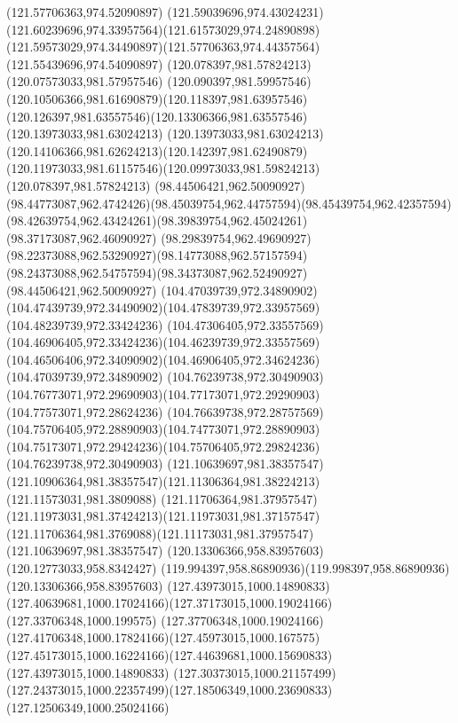 {    \lineto(121.57706363,974.52090897)
    \curveto(121.59039696,974.43024231)(121.60239696,974.33957564)(121.61573029,974.24890898)
    \curveto(121.59573029,974.34490897)(121.57706363,974.44357564)(121.55439696,974.54090897)
    \moveto(120.078397,981.57824213)
    \lineto(120.07573033,981.57957546)
    \curveto(120.090397,981.59957546)(120.10506366,981.61690879)(120.118397,981.63957546)
    \curveto(120.126397,981.63557546)(120.13306366,981.63557546)(120.13973033,981.63024213)
    \curveto(120.13973033,981.63024213)(120.14106366,981.62624213)(120.142397,981.62490879)
    \curveto(120.11973033,981.61157546)(120.09973033,981.59824213)(120.078397,981.57824213)
    \moveto(98.44506421,962.50090927)
    \curveto(98.44773087,962.4742426)(98.45039754,962.44757594)(98.45439754,962.42357594)
    \curveto(98.42639754,962.43424261)(98.39839754,962.45024261)(98.37173087,962.46090927)
    \curveto(98.29839754,962.49690927)(98.22373088,962.53290927)(98.14773088,962.57157594)
    \curveto(98.24373088,962.54757594)(98.34373087,962.52490927)(98.44506421,962.50090927)
    \moveto(104.47039739,972.34890902)
    \curveto(104.47439739,972.34490902)(104.47839739,972.33957569)(104.48239739,972.33424236)
    \curveto(104.47306405,972.33557569)(104.46906405,972.33424236)(104.46239739,972.33557569)
    \curveto(104.46506406,972.34090902)(104.46906405,972.34624236)(104.47039739,972.34890902)
    \moveto(104.76239738,972.30490903)
    \curveto(104.76773071,972.29690903)(104.77173071,972.29290903)(104.77573071,972.28624236)
    \curveto(104.76639738,972.28757569)(104.75706405,972.28890903)(104.74773071,972.28890903)
    \curveto(104.75173071,972.29424236)(104.75706405,972.29824236)(104.76239738,972.30490903)
    \moveto(121.10639697,981.38357547)
    \curveto(121.10906364,981.38357547)(121.11306364,981.38224213)(121.11573031,981.3809088)
    \curveto(121.11706364,981.37957547)(121.11973031,981.37424213)(121.11973031,981.37157547)
    \curveto(121.11706364,981.3769088)(121.11173031,981.37957547)(121.10639697,981.38357547)
    \moveto(120.13306366,958.83957603)
    \lineto(120.12773033,958.8342427)
    \curveto(119.994397,958.86890936)(119.998397,958.86890936)(120.13306366,958.83957603)
    \moveto(127.43973015,1000.14890833)
    \curveto(127.40639681,1000.17024166)(127.37173015,1000.19024166)(127.33706348,1000.199575)
    \curveto(127.37706348,1000.19024166)(127.41706348,1000.17824166)(127.45973015,1000.167575)
    \curveto(127.45173015,1000.16224166)(127.44639681,1000.15690833)(127.43973015,1000.14890833)
    \moveto(127.30373015,1000.21157499)
    \curveto(127.24373015,1000.22357499)(127.18506349,1000.23690833)(127.12506349,1000.25024166)
}
